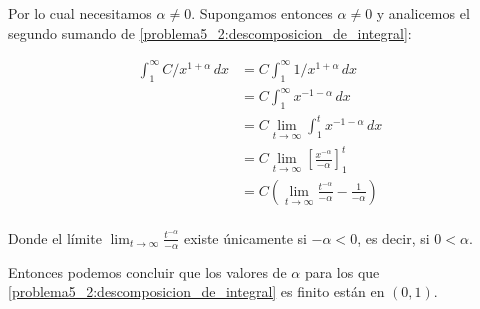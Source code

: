 Por lo cual necesitamos $\alpha \not= 0$. Supongamos entonces $\alpha \not= 0$ y analicemos el segundo sumando de \eqref{problema5_2:descomposicion_de_integral}:

\begin{align}
    \int_1^\infty C/x^{1+\alpha} \,dx   &=  C \int_1^\infty 1/x^{1+\alpha} \,dx                                                                     \\
                                        &=  C \int_1^\infty x^{-1-\alpha} \,dx                                                                      \\
                                        &=  C \lim_{t \rightarrow \infty} \int_1^t x^{-1-\alpha} \,dx                                               \\
                                        &=  C \lim_{t \rightarrow \infty} \left[ \frac{x^{-\alpha}}{-\alpha} \right]_1^t                            \\
                                        &=  C \left( \lim_{t \rightarrow \infty} \frac{t^{-\alpha}}{-\alpha} - \frac{1}{-\alpha} \right)            \\
\end{align}

Donde el límite $\lim_{t \rightarrow \infty} \frac{t^{-\alpha}}{-\alpha}$ existe únicamente si $-\alpha < 0$, es decir, si $0 < \alpha$.\pn

Entonces podemos concluir que los valores de $\alpha$ para los que \eqref{problema5_2:descomposicion_de_integral} es finito están en $(0, 1)$. 